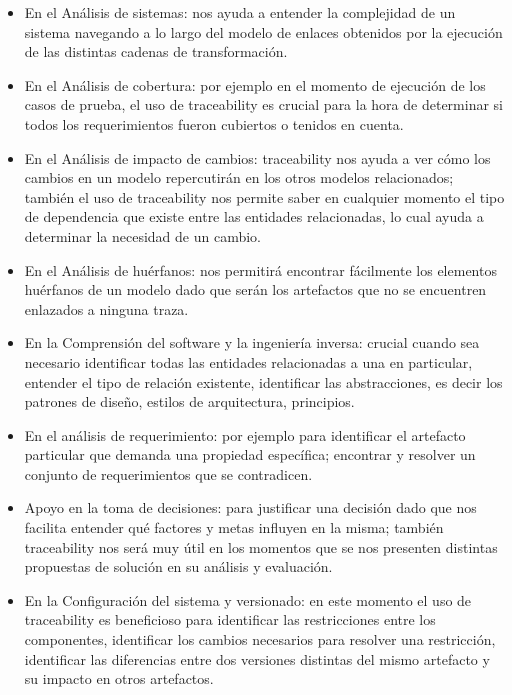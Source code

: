\documentclass[a4paper,12pt,oneside,spanish]{book}
\begin{document}
\begin{itemize}

\item En el Análisis de sistemas: nos ayuda a entender la complejidad de un sistema navegando a lo largo del modelo de enlaces obtenidos por la ejecución de las distintas cadenas de transformación.

\item En el Análisis de cobertura: por ejemplo en el momento de ejecución de los casos de prueba, el uso de traceability es crucial para la hora de determinar si todos los requerimientos fueron cubiertos o tenidos en cuenta.

 \item En el Análisis de impacto de cambios: traceability nos ayuda a ver cómo los cambios en un modelo repercutirán en los otros modelos relacionados; también el uso de traceability nos permite saber en cualquier momento el tipo de dependencia que existe entre las entidades relacionadas, lo cual ayuda a determinar la necesidad de un cambio.

 \item En el Análisis de huérfanos: nos permitirá encontrar fácilmente los elementos huérfanos de un modelo dado que serán los artefactos que no se encuentren enlazados a ninguna traza.

 \item En la Comprensión del software y la ingeniería inversa: crucial cuando sea necesario identificar todas las entidades relacionadas a una en particular, entender el tipo de relación existente, identificar las abstracciones, es decir los patrones de diseño, estilos de arquitectura, principios.

 \item En el análisis de requerimiento: por ejemplo para identificar el artefacto particular que demanda una propiedad específica; encontrar y resolver un conjunto de requerimientos que se contradicen.

 \item Apoyo en la toma de decisiones: para justificar una decisión dado que nos facilita entender qué factores y metas influyen en la misma; también traceability nos será muy útil en los momentos que se nos presenten distintas propuestas de solución en su análisis y evaluación.

\item En la Configuración del sistema y versionado: en este momento el uso de traceability es beneficioso para identificar las restricciones entre los componentes, identificar los cambios necesarios para resolver una restricción, identificar las diferencias entre dos versiones distintas del mismo artefacto y su impacto en otros artefactos.

\end{itemize}
\end{document}

